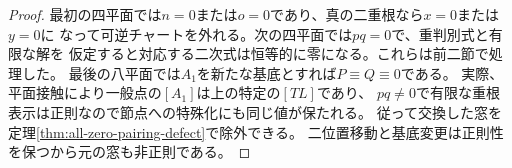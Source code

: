 \begin{proof}
最初の四平面では$n=0$または$o=0$であり、真の二重根なら$x=0$または$y=0$に
なって可逆チャートを外れる。次の四平面では$pq=0$で、重判別式と有限な解を
仮定すると対応する二次式は恒等的に零になる。これらは前二節で処理した。
最後の八平面では$A_1$を新たな基底とすれば$P\equiv Q\equiv0$である。
実際、平面接触により一般点の$[A_1]$は上の特定の$[TL]$であり、
$pq\ne0$で有限な重根表示は正則なので節点への特殊化にも同じ値が保たれる。
従って交換した窓を定理\ref{thm:all-zero-pairing-defect}で除外できる。
二位置移動と基底変更は正則性を保つから元の窓も非正則である。
\end{proof}
